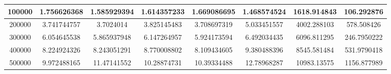 \documentclass{article}
\begin{document}
\begin{table}[]
\begin{tabular}{|c|c|c|c|c|c|c|c| }
100000	&1.756626368	&1.585929394	&1.614357233	&1.669086695	&1.468574524	&1618.914843	&106.292876\\ \hline
200000	&3.741744757	&3.7024014	&3.825145483	&3.708697319	&5.033451557	&4002.288103	&578.508426\\ \hline
300000	&6.054645538	&5.865937948	&6.147264957	&5.924173594	&6.492034435	&6096.811295	&246.7950222\\ \hline
400000	&8.224924326	&8.243051291	&8.770008802	&8.109434605	&9.380488396	&8545.581484	&531.9790418\\ \hline
500000	&9.972488165	&11.47141552	&10.28874731	&10.39334488	&12.78968287	&10983.13575	&1156.877989\\ \hline

       \end{tabular}
   \end{table}
\end{document}

